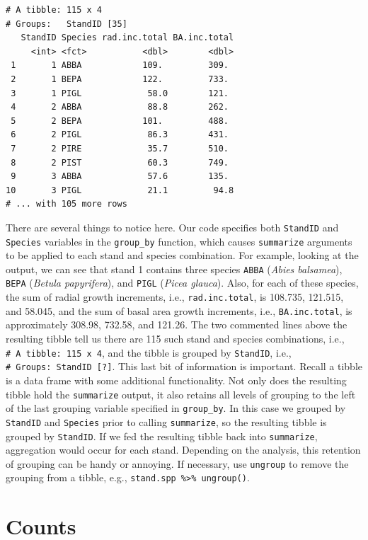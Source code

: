 \documentclass[]{krantz}
\begin{document}
\begin{verbatim}
# A tibble: 115 x 4
# Groups:   StandID [35]
   StandID Species rad.inc.total BA.inc.total
     <int> <fct>           <dbl>        <dbl>
 1       1 ABBA            109.         309. 
 2       1 BEPA            122.         733. 
 3       1 PIGL             58.0        121. 
 4       2 ABBA             88.8        262. 
 5       2 BEPA            101.         488. 
 6       2 PIGL             86.3        431. 
 7       2 PIRE             35.7        510. 
 8       2 PIST             60.3        749. 
 9       3 ABBA             57.6        135. 
10       3 PIGL             21.1         94.8
# ... with 105 more rows
\end{verbatim}

There are several things to notice here. Our code specifies both \texttt{StandID} and \texttt{Species} variables in the \texttt{group\_by} function, which causes \texttt{summarize} arguments to be applied to each stand and species combination. For example, looking at the output, we can see that stand 1 contains three species \texttt{ABBA} (\emph{Abies balsamea}), \texttt{BEPA} (\emph{Betula papyrifera}), and \texttt{PIGL} (\emph{Picea glauca}). Also, for each of these species, the sum of radial growth increments, i.e., \texttt{rad.inc.total}, is 108.735, 121.515, and 58.045, and the sum of basal area growth increments, i.e., \texttt{BA.inc.total}, is approximately 308.98, 732.58, and 121.26. The two commented lines above the resulting tibble tell us there are 115 such stand and species combinations, i.e., \texttt{\#\ A\ tibble:\ 115\ x\ 4}, and the tibble is grouped by \texttt{StandID}, i.e., \texttt{\#\ Groups:\ StandID\ {[}?{]}}. This last bit of information is important. Recall a tibble is a data frame with some additional functionality. Not only does the resulting tibble hold the \texttt{summarize} output, it also retains all levels of grouping to the left of the last grouping variable specified in \texttt{group\_by}. In this case we grouped by \texttt{StandID} and \texttt{Species} prior to calling \texttt{summarize}, so the resulting tibble is grouped by \texttt{StandID}. If we fed the resulting tibble back into \texttt{summarize}, aggregation would occur for each stand. Depending on the analysis, this retention of grouping can be handy or annoying. If necessary, use \texttt{ungroup} to remove the grouping from a tibble, e.g., \texttt{stand.spp\ \%\textgreater{}\%\ ungroup()}.

\hypertarget{counts}{%
\section{Counts}\label{counts}}
\end{document}
